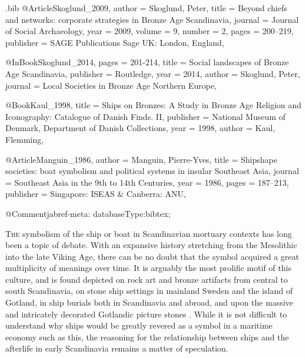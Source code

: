 \begin{filecontents}{\IJSRAidentifier.bib}
@Article{Skoglund_2009,
	author    = {Skoglund, Peter},
	title     = {Beyond chiefs and networks: corporate strategies in Bronze Age Scandinavia},
	journal   = {Journal of Social Archaeology},
	year      = {2009},
	volume    = {9},
	number    = {2},
	pages     = {200--219},
	publisher = {SAGE Publications Sage UK: London, England},
}

@InBook{Skoglund_2014,
	pages     = {201-214},
	title     = {Social landscapes of Bronze Age Scandinavia},
	publisher = {Routledge},
	year      = {2014},
	author    = {Skoglund, Peter},
	journal   = {Local Societies in Bronze Age Northern Europe},
}

@Book{Kaul_1998,
	title     = {Ships on Bronzes: A Study in Bronze Age Religion and Iconography: Catalogue of Danish Finds. II},
	publisher = {National Museum of Denmark, Department of Danish Collections},
	year      = {1998},
	author    = {Kaul, Flemming},
}

@Article{Manguin_1986,
	author    = {Manguin, Pierre-Yves},
	title     = {Shipshape societies: boat symbolism and political systems in insular Southeast Asia},
	journal   = {Southeast Asia in the 9th to 14th Centuries},
	year      = {1986},
	pages     = {187--213},
	publisher = {Singapore: ISEAS \& Canberra: ANU},
}

@Comment{jabref-meta: databaseType:bibtex;}

\end{filecontents}
\IJSRAopening%
\lettrine{T}{he} symbolism of the ship or boat in Scandinavian mortuary contexts has long been a topic of debate. With an expansive history stretching from the Mesolithic into the late Viking Age, there can be no doubt that the symbol acquired a great multiplicity of meanings over time. It is arguably the most prolific motif of this culture, and is found depicted on rock art and bronze artifacts from central to south Scandinavia, on stone ship settings in mainland Sweden and the island of Gotland, in ship burials both in Scandinavia and abroad, and upon the massive and intricately decorated Gotlandic picture stones \parencites[264--266]{Price_2008}[93]{Wehlin_2010}. While it is not difficult to understand why ships would be greatly revered as a symbol in a maritime economy such as this, the reasoning for the relationship between ships and the afterlife in early Scandinavia remains a matter of speculation.

